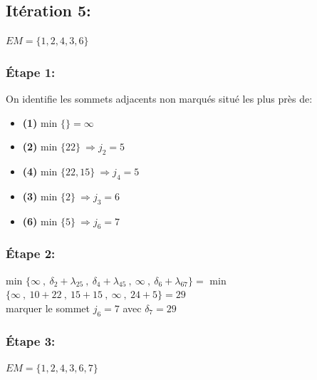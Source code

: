 \documentclass{article}
\begin{document}
\subsection*{Itération 5:}
$EM = \{1,2,4,3,6\}$
\subsubsection*{Étape 1:}
On identifie les sommets adjacents non marqués situé les plus près de:
\begin{itemize}
    \item \textbf{(1)} min $\{\}=\infty$
    \item \textbf{(2)} min $\{22\}\: \Rightarrow j_2 = 5$ \\
    \item \textbf{(4)} min $\{22,15\}\: \Rightarrow j_4 =5$ \\
    \item \textbf{(3)} min $\{2\}\: \Rightarrow j_3 =6$ \\
    \item \textbf{(6)} min $\{5\}\: \Rightarrow j_6 = 7$ \\
\end{itemize}
\subsubsection*{Étape 2:}
min $\{ \infty \:,\: \delta_2 +\lambda_{25} \:,\: \delta_4 + \lambda_{45} \:,\: \infty \:,\: \delta_6 + \lambda_{67}\} = $ min $\{\infty \:,\: 10+22\:,\:15+15\:,\: \infty \:,\:24+5\}=29$\\
marquer le sommet $j_6=7$ avec $\delta_7=29$ 
\subsubsection*{Étape 3:}
$EM=\{1,2,4,3,6,7\}$
\end{document}
